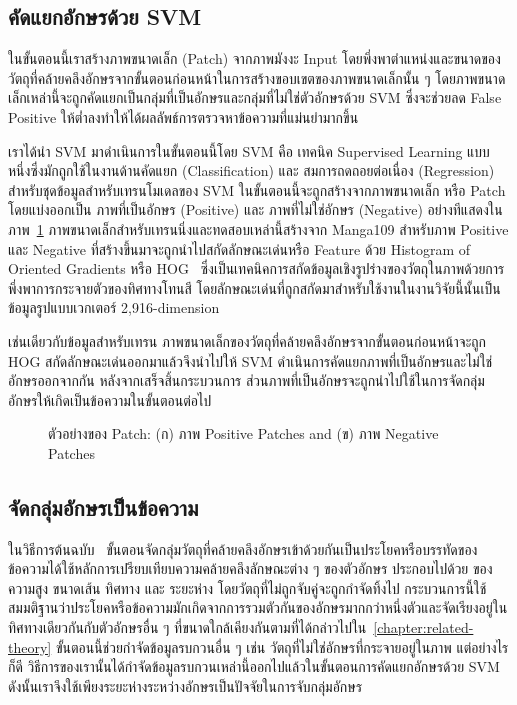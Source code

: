 \subsection{คัดแยกอักษรด้วย SVM}

ในขั้นตอนนี้เราสร้างภาพขนาดเล็ก (Patch) จากภาพมังงะ Input โดยพึ่งพาตำแหน่งและขนาดของวัตถุที่คล้ายคลึงอักษรจากขั้นตอนก่อนหน้าในการสร้างขอบเขตของภาพขนาดเล็กนั้น ๆ โดยภาพขนาดเล็กเหล่านี้จะถูกคัดแยกเป็นกลุ่มที่เป็นอักษรและกลุ่มที่ไม่ใช่ตัวอักษรด้วย SVM ซึ่งจะช่วยลด False Positive ให้ต่ำลงทำให้ได้ผลลัพธ์การตรวจหาข้อความที่แม่นยำมากขึ้น

เราได้นำ SVM มาดำเนินการในขั้นตอนนี้โดย SVM คือ เทคนิค Supervised Learning แบบหนึ่งซึ่งมักถูกใช้ในงานด้านคัดแยก (Classification) และ สมการถดถอยต่อเนื่อง (Regression)~\cite{Suykens1999} สำหรับชุดข้อมูลสำหรับเทรนโมเดลของ SVM ในขั้นตอนนี้จะถูกสร้างจากภาพขนาดเล็ก หรือ Patch โดยแบ่งออกเป็น ภาพที่เป็นอักษร (Positive) และ ภาพที่ไม่ใช่อักษร (Negative) อย่างทีแสดงในภาพ~\ref{Fig:sliced_window} ภาพขนาดเล็กสำหรับเทรนนิ่งและทดสอบเหล่านี้สร้างจาก Manga109 สำหรับภาพ Positive และ Negative ที่สร้างขึ้นมาจะถูกนำไปสกัดลักษณะเด่นหรือ Feature ด้วย Histogram of Oriented Gradients หรือ HOG~\cite{Freeman} ซึ่งเป็นเทคนิคการสกัดข้อมูลเชิงรูปร่างของวัตถุในภาพด้วยการพึ่งพาการกระจายตัวของทิศทางโทนสี โดยลักษณะเด่นที่ถูกสกัดมาสำหรับใช้งานในงานวิจัยนี้นั้นเป็นข้อมูลรูปแบบเวกเตอร์ 2,916-dimension

เช่นเดียวกับข้อมูลสำหรับเทรน ภาพขนาดเล็กของวัตถุที่คล้ายคลึงอักษรจากขั้นตอนก่อนหน้าจะถูก HOG สกัดลักษณะเด่นออกมาแล้วจึงนำไปให้ SVM ดำเนินการคัดแยกภาพที่เป็นอักษรและไม่ใช่อักษรออกจากกัน หลังจากเสร็จสิ้นกระบวนการ ส่วนภาพที่เป็นอักษรจะถูกนำไปใช้ในการจัดกลุ่มอักษรให้เกิดเป็นข้อความในขั้นตอนต่อไป

\begin{figure}[!h]
    \centering
    \caption{ตัวอย่างของ Patch: (ก) ภาพ Positive Patches and (ข) ภาพ Negative Patches}
    \label{Fig:sliced_window}
\end{figure}

\subsection{จัดกลุ่มอักษรเป็นข้อความ}

ในวิธีการต้นฉบับ~\cite{5540041} ขั้นตอนจัดกลุ่มวัตถุที่คล้ายคลึงอักษรเข้าด้วยกันเป็นประโยคหรือบรรทัดของข้อความได้ใช้หลักการเปรียบเทียบความคล้ายคลึงลักษณะต่าง ๆ ของตัวอักษร ประกอบไปด้วย ของความสูง ขนาดเส้น ทิศทาง และ ระยะห่าง โดยวัตถุที่ไม่ถูกจับคู่จะถูกกำจัดทิ้งไป กระบวนการนี้ใช้สมมติฐานว่าประโยคหรือข้อความมักเกิดจากการรวมตัวกันของอักษรมากกว่าหนึ่งตัวและจัดเรียงอยู่ในทิศทางเดียวกันกับตัวอักษรอื่น ๆ ที่ขนาดใกล้เคียงกันตามที่ได้กล่าวไปใน~\ref{chapter:related-theory} ขั้นตอนนี้ช่วยกำจัดข้อมูลรบกวนอื่น ๆ เช่น วัตถุที่ไม่ใช่อักษรที่กระจายอยู่ในภาพ แต่อย่างไรก็ดี วิธีการของเรานั้นได้กำจัดข้อมูลรบกวนเหล่านี้ออกไปแล้วในขั้นตอนการคัดแยกอักษรด้วย SVM ดังนั้นเราจึงใช้เพียงระยะห่างระหว่างอักษรเป็นปัจจัยในการจับกลุ่มอักษร

